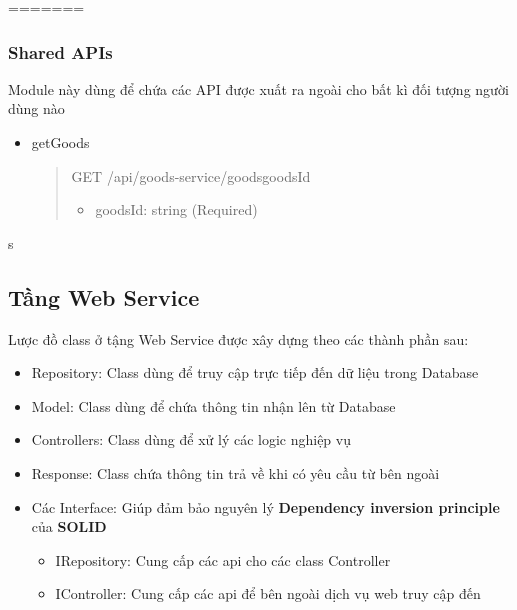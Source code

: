 =======

\subsubsection{Shared APIs}
Module này dùng để chứa các API được xuất ra ngoài cho bất kì đối tượng người dùng nào

\begin{itemize}
	\item getGoods
	      \begin{quote}
		      GET /api/goods-service/goods{goodsId}
		      \begin{itemize}
			      \item goodsId: string (Required)
		      \end{itemize}
	      \end{quote}
\end{itemize}

s



\subsection{Tầng Web Service}

Lược đồ class ở tậng Web Service được xây dựng theo các thành phần sau:
\begin{itemize}
	\item Repository: Class dùng để truy cập trực tiếp đến dữ liệu trong Database
	\item Model: Class dùng để chứa thông tin nhận lên từ Database
	\item Controllers: Class dùng để xử lý các logic nghiệp vụ
	\item Response: Class chứa thông tin trả về khi có yêu cầu từ bên ngoài
	\item Các Interface: Giúp đảm bảo nguyên lý \textbf{Dependency inversion principle} của \textbf{SOLID}
	\begin {itemize}
		\item IRepository: Cung cấp các api cho các class Controller
		\item IController: Cung cấp các api để bên ngoài dịch vụ web truy cập đến
	\end{itemize}
\end{itemize}



